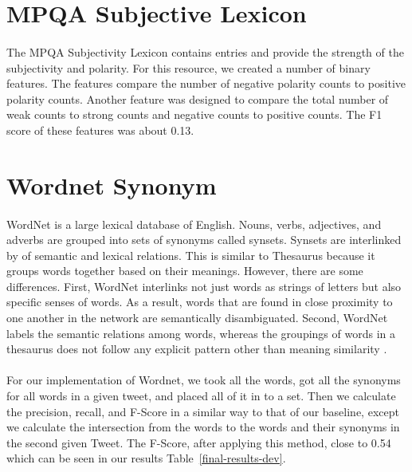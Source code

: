 \documentclass[11pt,letterpaper]{article}
\begin{document}
\section{MPQA Subjective Lexicon}
\paragraph{}
The MPQA Subjectivity Lexicon contains entries and provide the strength of the subjectivity and polarity. For this resource, we created a number of binary features. The features compare the number of negative polarity counts to positive polarity counts. Another feature was designed to compare the total number of weak counts to strong counts and negative counts to positive counts. The F1 score of these features was about 0.13. 

\section{Wordnet Synonym}
\paragraph{}
WordNet is a large lexical database of English. Nouns, verbs, adjectives, and adverbs are grouped into sets of synonyms called synsets. Synsets are interlinked by of semantic and lexical relations. This is similar to Thesaurus because it groups words together based on their meanings. However, there are some differences. First, WordNet interlinks not just words as strings of letters but also specific senses of words. As a result, words that are found in close proximity to one another in the network are semantically disambiguated. Second, WordNet labels the semantic relations among words, whereas the groupings of words in a thesaurus does not follow any explicit pattern other than meaning similarity \cite{wordnet}.

\paragraph{}
For our implementation of Wordnet, we took all the words, got all the synonyms for all words in a given tweet, and placed all of it in to a set. Then we calculate the precision, recall, and F-Score in a similar way to that of our baseline, except we calculate the intersection from the words to the words and their synonyms in the second given Tweet. The F-Score, after applying this method, close to 0.54 which can be seen in our results Table~\ref{final-results-dev}.
\end{document}
